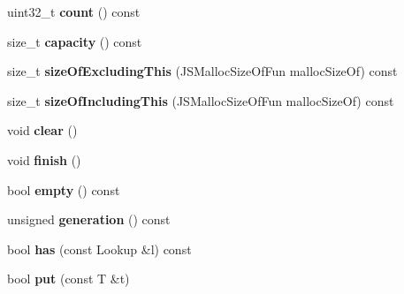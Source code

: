 \begin{DoxyCompactItemize}
\item 
\hypertarget{classjs_1_1_hash_set_a46ab8791b3eeb07bbe7d850dc5f731d6}{uint32\-\_\-t {\bfseries count} () const }\label{classjs_1_1_hash_set_a46ab8791b3eeb07bbe7d850dc5f731d6}

\item 
\hypertarget{classjs_1_1_hash_set_a9f98aaee411c849fb7372a0b795e6502}{size\-\_\-t {\bfseries capacity} () const }\label{classjs_1_1_hash_set_a9f98aaee411c849fb7372a0b795e6502}

\item 
\hypertarget{classjs_1_1_hash_set_a06891e464c85cec94d825fc06715e40c}{size\-\_\-t {\bfseries size\-Of\-Excluding\-This} (J\-S\-Malloc\-Size\-Of\-Fun malloc\-Size\-Of) const }\label{classjs_1_1_hash_set_a06891e464c85cec94d825fc06715e40c}

\item 
\hypertarget{classjs_1_1_hash_set_abb3f8f4399707daeaa8ad85c0d422811}{size\-\_\-t {\bfseries size\-Of\-Including\-This} (J\-S\-Malloc\-Size\-Of\-Fun malloc\-Size\-Of) const }\label{classjs_1_1_hash_set_abb3f8f4399707daeaa8ad85c0d422811}

\item 
\hypertarget{classjs_1_1_hash_set_a96567177092ffb8d80898c03194e7f64}{void {\bfseries clear} ()}\label{classjs_1_1_hash_set_a96567177092ffb8d80898c03194e7f64}

\item 
\hypertarget{classjs_1_1_hash_set_ac18de70d1014b703894569aaab8432b4}{void {\bfseries finish} ()}\label{classjs_1_1_hash_set_ac18de70d1014b703894569aaab8432b4}

\item 
\hypertarget{classjs_1_1_hash_set_ae5870c6683ef2161166a092ad737f135}{bool {\bfseries empty} () const }\label{classjs_1_1_hash_set_ae5870c6683ef2161166a092ad737f135}

\item 
\hypertarget{classjs_1_1_hash_set_a0e8958f35d9753bcfcb2e1ca151c82b3}{unsigned {\bfseries generation} () const }\label{classjs_1_1_hash_set_a0e8958f35d9753bcfcb2e1ca151c82b3}

\item 
\hypertarget{classjs_1_1_hash_set_ace5f9b823d7fcdec8abb024af29c477f}{bool {\bfseries has} (const Lookup \&l) const }\label{classjs_1_1_hash_set_ace5f9b823d7fcdec8abb024af29c477f}

\item 
\hypertarget{classjs_1_1_hash_set_a761772ec1dce8e9f01ea16004e11eb42}{bool {\bfseries put} (const T \&t)}\label{classjs_1_1_hash_set_a761772ec1dce8e9f01ea16004e11eb42}


\end{DoxyCompactItemize}
